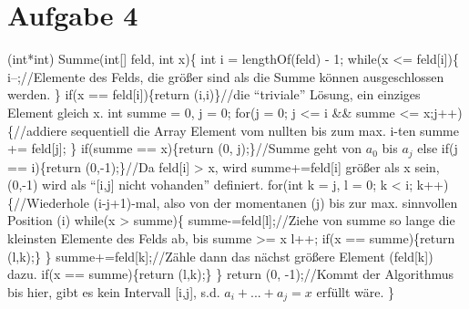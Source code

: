 \documentclass[a4paper,10pt,oneside,leqno]{scrartcl}
\begin{document}
\section*{Aufgabe 4}
(int*int) Summe(int[] feld, int x)\{\newline
int i = lengthOf(feld) - 1;\newline
while(x <= feld[i])\{\newline
i--;//Elemente des Felds, die größer sind als die Summe können ausgeschlossen werden.\newline
\}\newline
if(x == feld[i])\{return (i,i)\}//die ``triviale'' Lösung, ein einziges Element gleich x.\newline
int summe = 0, j = 0;\newline
for(j = 0; j <= i && summe <= x;j++)\{//addiere sequentiell die Array Element vom nullten bis zum max. i-ten\newline
summe += feld[j];\newline
\}\newline
if(summe == x)\{return (0, j);\}//Summe geht von $a_0$ bis $a_j$\newline
else if(j == i)\{return (0,-1);\}//Da feld[i] > x, wird summe+=feld[i] größer als x sein, (0,-1) wird als ``[i,j] nicht vohanden'' definiert.\newline
for(int k = j, l = 0; k < i; k++)\{//Wiederhole (i-j+1)-mal, also von der momentanen (j) bis zur max. sinnvollen Position (i)\newline
while(x > summe)\{\newline
summe-=feld[l];//Ziehe von summe so lange die kleinsten Elemente des Felds ab, bis summe >= x\newline
l++;\newline
if(x == summe)\{return (l,k);\}\newline
\}\newline
summe+=feld[k];//Zähle dann das nächst größere Element (feld[k]) dazu.\newline
if(x == summe)\{return (l,k);\}\newline
\}\newline
return (0, -1);//Kommt der Algorithmus bis hier, gibt es kein Intervall [i,j], s.d. $a_i+...+a_j = x$ erfüllt wäre.\newline
\}\newline
\end{document}
